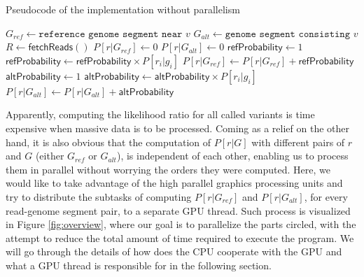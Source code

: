 \documentclass{PHlab-thesis}
\begin{document}
\begin{algorithm}
	\caption{Pseudocode of the implementation without parallelism}
	\label{alg:loop}
	\begin{algorithmic}
		\State $G_{ref} \gets \texttt{reference genome segment near } v$
		\State $G_{alt} \gets \texttt{genome segment consisting } v$
		\State $R \gets \mathsf{fetchReads}()$ 
			\State $P[r|G_{ref}] \gets 0$
			\State $P[r|G_{alt}] \gets 0$
				\State $\mathsf{refProbability} \gets 1$
					\State $\mathsf{refProbability} \gets \mathsf{refProbability} \times P[r_i|g_i]$
				\EndFor
				\State $P[r|G_{ref}] \gets P[r|G_{ref}] + \mathsf{refProbability}$
			\EndFor
				\State $\mathsf{altProbability} \gets 1$
					\State $\mathsf{altProbability} \gets \mathsf{altProbability} \times P[r_i|g_i]$
				\EndFor
				\State $P[r|G_{alt}] \gets P[r|G_{alt}] + \mathsf{altProbability}$
			\EndFor
		\EndFor
	\EndFor
	\end{algorithmic}
\end{algorithm}
Apparently, computing the likelihood ratio for all called variants is time expensive when massive data is to be processed. Coming as a relief on the other hand, it is also obvious that the computation of $P[r|G]$ with different pairs of $r$ and $G$ (either $G_{ref}$ or $G_{alt}$), is independent of each other, enabling us to process them in parallel without worrying the orders they were computed. Here, we would like to take advantage of the high parallel graphics processing units and try to distribute the subtasks of computing $P[r|G_{ref}]$ and $P[r|G_{alt}]$, for every read-genome segment pair, to a separate GPU thread. Such process is visualized in Figure \ref{fig:overview}, where our goal is to parallelize the parts circled, with the attempt to reduce the total amount of time required to execute the program. We will go through the details of how does the CPU cooperate with the GPU and what a GPU thread is responsible for in the following section.
\end{document}
